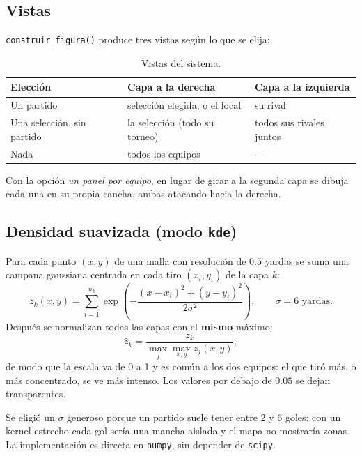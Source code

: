 \documentclass[11pt,a4paper]{article}
\begin{document}
\subsection{Vistas}

\texttt{construir\_figura()} produce tres vistas según lo que se elija:

\begin{table}[H]
\centering
\begin{tabular}{@{}lll@{}}
\toprule
Elección & Capa a la derecha & Capa a la izquierda \\
\midrule
Un partido               & selección elegida, o el local & su rival \\
Una selección, sin partido & la selección (todo su torneo) & todos sus rivales juntos \\
Nada                     & todos los equipos & --- \\
\bottomrule
\end{tabular}
\caption{Vistas del sistema.}
\end{table}

Con la opción \emph{un panel por equipo}, en lugar de girar a la segunda capa se dibuja
cada una en su propia cancha, ambas atacando hacia la derecha.

\subsection{Densidad suavizada (modo \texttt{kde})}

Para cada punto $(x, y)$ de una malla con resolución de $0.5$ yardas se suma una
campana gaussiana centrada en cada tiro $(x_i, y_i)$ de la capa $k$:
\begin{equation}
  z_k(x, y) = \sum_{i=1}^{n_k} \exp\!\left( -\frac{(x - x_i)^2 + (y - y_i)^2}{2\sigma^2} \right),
  \qquad \sigma = 6 \text{ yardas}.
\end{equation}
Después se normalizan todas las capas con el \textbf{mismo} máximo:
\begin{equation}
  \hat z_k = \frac{z_k}{\max_{j} \max_{x,y} z_j(x, y)},
\end{equation}
de modo que la escala va de 0 a 1 y es común a los dos equipos: el que tiró más, o más
concentrado, se ve más intenso. Los valores por debajo de $0.05$ se dejan transparentes.

Se eligió un $\sigma$ generoso porque un partido suele tener entre 2 y 6 goles:
con un kernel estrecho cada gol sería una mancha aislada y el mapa no mostraría
zonas. La implementación es directa en \texttt{numpy}, sin depender de \texttt{scipy}.
\end{document}
